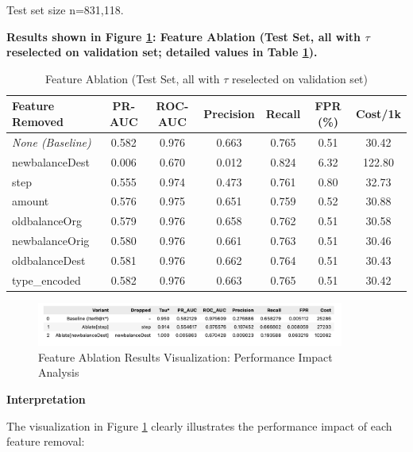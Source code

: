 \documentclass[sigplan,screen]{acmart}
\begin{document}
Test set size n=831,118.

\textbf{Results shown in Figure \ref{fig:feature_ablation_viz}: Feature Ablation (Test Set, all with $\tau$ reselected on validation set; detailed values in Table \ref{tab:feature_ablation}).}

\begin{table}[h!]
    \centering
\renewcommand{\arraystretch}{1.2}
\caption{Feature Ablation (Test Set, all with $\tau$ reselected on validation set)}
\label{tab:feature_ablation}
\begin{tabular}{|l|c|c|c|c|c|c|}
\hline
\textbf{Feature Removed} & \textbf{PR-AUC} & \textbf{ROC-AUC} & \textbf{Precision} & \textbf{Recall} & \textbf{FPR (\%)} & \textbf{Cost/1k} \\
\hline
\textit{None (Baseline)} & 0.582 & 0.976 & 0.663 & 0.765 & 0.51 & 30.42 \\
\hline
newbalanceDest & 0.006 & 0.670 & 0.012 & 0.824 & 6.32 & 122.80 \\
\hline
step & 0.555 & 0.974 & 0.473 & 0.761 & 0.80 & 32.73 \\
\hline
amount & 0.576 & 0.975 & 0.651 & 0.759 & 0.52 & 30.88 \\
\hline
oldbalanceOrg & 0.579 & 0.976 & 0.658 & 0.762 & 0.51 & 30.58 \\
\hline
newbalanceOrig & 0.580 & 0.976 & 0.661 & 0.763 & 0.51 & 30.46 \\
\hline
oldbalanceDest & 0.581 & 0.976 & 0.662 & 0.764 & 0.51 & 30.43 \\
\hline
type\_encoded & 0.582 & 0.976 & 0.663 & 0.765 & 0.51 & 30.42 \\
\hline
\end{tabular}
\end{table}

\begin{figure}[h!]
    \centering
    \includegraphics[width=0.9\textwidth]{4.1.3.png}
    \caption{Feature Ablation Results Visualization: Performance Impact Analysis}
    \label{fig:feature_ablation_viz}
\end{figure}

\textbf{Interpretation}

The visualization in Figure \ref{fig:feature_ablation_viz} clearly illustrates the performance impact of each feature removal:
\end{document}
